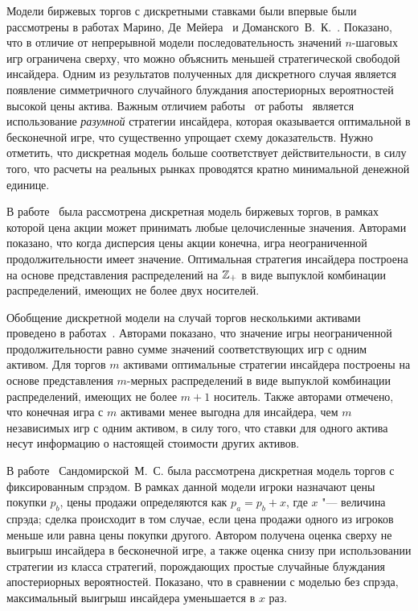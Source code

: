 Модели биржевых торгов с дискретными ставками были впервые были рассмотрены в работах Марино, Де~Мейера~\cite{demeyer05} и Доманского~В.~К.~\cite{domansky07}.
Показано, что в отличие от непрерывной модели последовательность значений $n$-шаговых игр ограничена сверху, что можно объяснить меньшей стратегической свободой инсайдера.
Одним из результатов полученных для дискретного случая является появление симметричного случайного блуждания апостериорных вероятностей высокой цены актива.
Важным отличием работы~\cite{domansky07} от работы~\cite{demeyer05} является использование \emph{разумной} стратегии инсайдера, которая оказывается оптимальной в бесконечной игре, что существенно упрощает схему доказательств. 
Нужно отметить, что дискретная модель больше соответствует действительности, в силу того, что расчеты на реальных рынках проводятся кратно минимальной денежной единице.

В работе~\cite{domansky11} была рассмотрена дискретная модель биржевых торгов, в рамках которой цена акции может принимать любые целочисленные значения.
Авторами показано, что когда дисперсия цены акции конечна, игра неограниченной продолжительности имеет значение.
Оптимальная стратегия инсайдера построена на основе представления распределений на $\mathbb{Z}_+$ в виде выпуклой комбинации распределений, имеющих не более двух носителей.

Обобщение дискретной модели на случай торгов несколькими активами проведено в работах~\cite{domansky13, domansky14}.
Авторами показано, что значение игры неограниченной продолжительности равно сумме значений соответствующих игр с одним активом.
Для торгов $m$ активами оптимальные стратегии инсайдера построены на основе представления $m$-мерных распределений в виде выпуклой комбинации распределений, имеющих не более $m+1$ носитель.
Также авторами отмечено, что конечная игра с $m$ активами менее выгодна для инсайдера, чем $m$ независимых игр с одним активом, в силу того, что ставки для одного актива несут информацию о настоящей стоимости других активов.

В работе~\cite{sandomirskaya14} Сандомирской~М.~С. была рассмотрена дискретная модель торгов с фиксированным спрэдом.
В рамках данной модели игроки назначают цены покупки $p_b$, цены продажи определяются как $p_a = p_b + x$, где $x$ "--- величина спрэда; сделка происходит в том случае, если цена продажи одного из игроков меньше или равна цены покупки другого. 
Автором получена оценка сверху не выигрыш инсайдера в бесконечной игре, а также оценка снизу при использовании стратегии из класса стратегий, порождающих простые случайные блуждания апостериорных вероятностей. 
Показано, что в сравнении с моделью без спрэда, максимальный выигрыш инсайдера уменьшается в $x$ раз.

